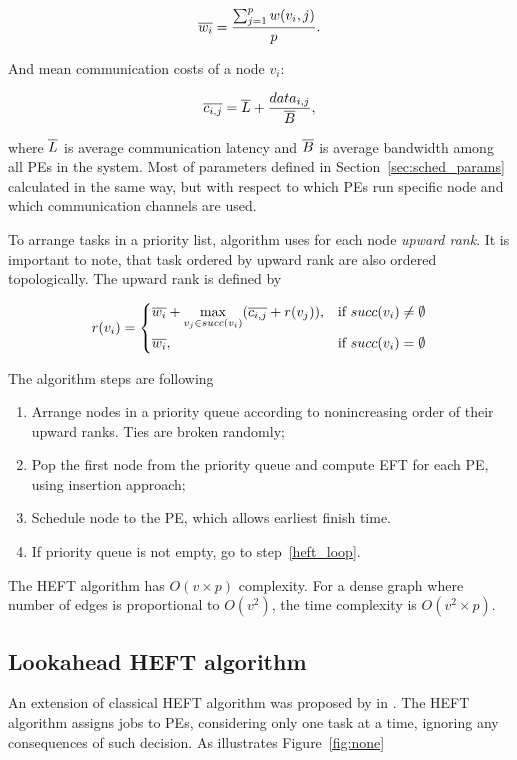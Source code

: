 \[
\overline{w_i} = \frac{\sum_{j=1}^p w(v_i,j)}{p}.
\]


And mean communication costs of a node $v_i$:

\[
\overline{c_{i,j}} = \overline{L} + \frac{data_{i,j}}{\overline{B}},
\]

where $\overline{L}$ is average communication latency and $\overline{B}$ is
average bandwidth among all PEs in the system. Most of parameters
defined in Section~\ref{sec:sched_params} calculated in the same way,
but with respect to which PEs run specific node and which
communication channels are used.

To arrange tasks in a priority list, algorithm uses for each node
\emph{upward rank}. It is important to note, that task ordered by
upward rank are also ordered topologically. The upward rank is defined
by

\[
r(v_i) =
\begin{dcases}
  \overline{w_i} + \max_{v_j \in succ(v_i)}(\overline{c_{i,j}} + r(v_j)),  &  \text{if } succ(v_i) \neq \emptyset\\
  \overline{w_i},  &  \text{if } succ(v_i) = \emptyset
\end{dcases}
\]

The algorithm steps are following

\begin{enumerate}
\item Arrange nodes in a priority queue according to nonincreasing
  order of their upward ranks. Ties are broken randomly;
\item \label{heft_loop} Pop the first node from the priority queue and
  compute EFT for each PE, using insertion approach;
\item Schedule node to the PE, which allows earliest finish time.
\item If priority queue is not empty, go to step~\ref{heft_loop}.
\end{enumerate}

The HEFT algorithm has $O(v\times p)$ complexity. For a dense graph
where number of edges is proportional to $O(v^2)$, the time complexity
is $O(v^2 \times p)$.


\subsection{Lookahead HEFT algorithm}
\label{sec:heft_lookahead}

An extension of classical HEFT algorithm was proposed by
\citeauthor{bittencourt2010dag} in \cite{bittencourt2010dag}. The HEFT
algorithm assigns jobs to PEs, considering only one task at a time,
ignoring any consequences of such decision. As illustrates
Figure~\ref{fig:none}




\cleardoublepage

